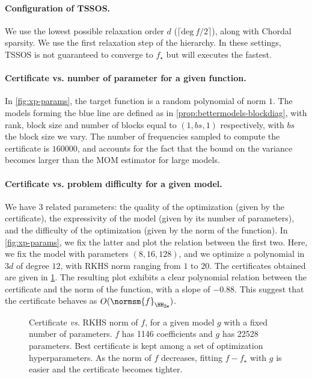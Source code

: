 \documentclass{article}
\begin{document}
\paragraph{Configuration of TSSOS.}
We use the lowest possible relaxation order $d$ (\ie $\lceil \mathrm{deg} ~ f / 2 \rceil$), along with Chordal sparsity. We use the first relaxation step of the hierarchy. In these settings, TSSOS is not guaranteed to converge to $f_\star$ but will executes the fastest.

\paragraph{Certificate vs. number of parameter for a given function.}
In \cref{fig:xp-params}, the target function is a random polynomial of norm $1$. The models forming the blue line are defined as in \cref{prop:bettermodels-blockdiag}, with rank, block size and number of blocks equal to $(1, bs, 1)$ respectively, with $bs$ the block size we vary. The number of frequencies sampled to compute the certificate is $160000$, and accounts for the fact that the bound on the variance becomes larger than the MOM estimator for large models.

\paragraph{Certificate vs. problem difficulty for a given model.}
We have 3 related parameters: the quality of the optimization (given by the certificate), the expressivity of the model (given by its number of parameters), and the difficulty of the optimization (given by the norm of the function). In \cref{fig:xp-params}, we fix the latter and plot the relation between the first two. Here, we fix the model with parameters $(8, 16, 128)$, and we optimize a polynomial in $3d$ of degree $12$, with RKHS norm ranging from $1$ to $20$. The certificates obtained are given in \cref{fig:xp-hnorm2}. The resulting plot exhibits a clear polynomial relation between the certificate and the norm of the function, with a slope of $-0.88$. This suggest that the certificate behaves as $O(\normsm{f}_{\HH_{2 \mathbf{s}}})$.

\begin{figure}
  \centering
  
  \caption{Certificate \emph{vs.} RKHS norm of $f$, for a given model $g$ with a fixed number of parameters. $f$ has 1146 coefficients and $g$ has 22528 parameters. Best certificate is kept among a set of optimization hyperparameters. As the norm of $f$ decreases, fitting $f - f_\star$ with $g$ is easier and the certificate becomes tighter.}
  \label{fig:xp-hnorm2}
\end{figure}
\end{document}
